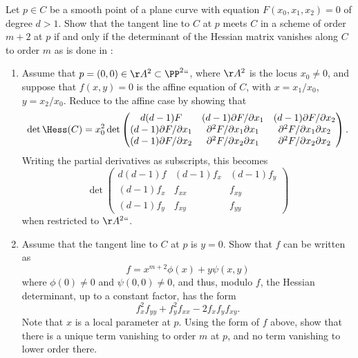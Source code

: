 \begin{exercise}\label{Hessian exercise}
Let $p\in C$ be a smooth point of a  plane curve with equation $F(x_0,x_1,x_2) = 0$ of degree $d>1$. Show that the tangent line to $C$ at $p$ meets
$C$ in a scheme of order $m+2$ at $p$ if and only if the determinant of the Hessian matrix vanishes
%
along $C$ to order $m$ as is done in \cite[pp.~84--85]{Kunz}:

\begin{enumerate}
\item Assume that $p = (0,0)\in \AA^2\subset \PP^2` `$, where $\AA^2$ is the locus $x_0\neq 0$,
and suppose that $f(x,y) =0$ is the affine equation of $C$, with $x= x_1/x_0$,
$y = x_2/x_0$.
Reduce to the affine case by showing that
$$
\det \Hess(C) =
x_0^2 \det
\begin{pmatrix}
 d(d-1)F & (d-1) \partial F/\partial x_1 & (d-1) \partial F/\partial x_2 \\
 (d-1) \partial F/\partial x_1&\partial^2 F/\partial x_1 \partial x_1 & \partial^2 F/\partial x_1 \partial x_2\\
 (d-1) \partial F/\partial x_2 &\partial^2 F/\partial x_2 \partial x_1 & \partial^2 F/\partial x_2 \partial x_2
\end{pmatrix} .
$$
Writing the partial derivatives as subscripts, this becomes
$$
\det \begin{pmatrix}
 d(d-1)f & (d-1) f_x & (d-1) f_y \\
 (d-1) f_x&f_{xx} & f_{xy}\\
 (d-1) f_y &f_{xy} & f_{yy}
\end{pmatrix}
$$
when restricted to $\AA^2` `$.

\item Assume that the tangent line to $C$ at $p$ is $y=0$. Show that $f$ can be written as
$$
f = x^{m+2}\phi(x) +y\psi(x,y)
$$
where $\phi(0) \neq 0$ and $\psi(0,0) \neq 0$, and thus, modulo $f$, the Hessian determinant,
up to a constant factor,
has the form
$$
f_x^2f_{yy}+f_y^2f_{xx}-2f_xf_yf_{xy}.
$$
Note that $x$ is a local parameter at $p$. Using the form of $f$ above, show that there is a unique term vanishing to order $m$ at $p$,
and no term vanishing to lower order there.
\end{enumerate}
\end{exercise}


